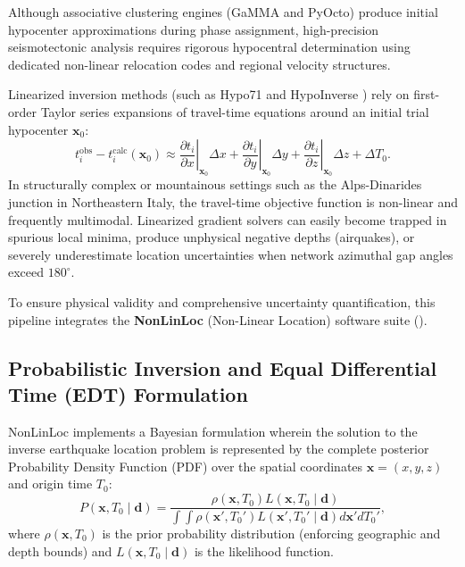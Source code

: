 Although associative clustering engines (GaMMA and PyOcto) produce initial hypocenter approximations during phase assignment, high-precision seismotectonic analysis requires rigorous hypocentral determination using dedicated non-linear relocation codes and regional velocity structures.

Linearized inversion methods (such as Hypo71 \cite{Hypo71} and HypoInverse \cite{HypoInverse}) rely on first-order Taylor series expansions of travel-time equations around an initial trial hypocenter $\mathbf{x}_0$:
\begin{equation}
  t_i^{\mathrm{obs}} - t_i^{\mathrm{calc}}(\mathbf{x}_0) \approx \left. \frac{\partial t_i}{\partial x} \right|_{\mathbf{x}_0} \Delta x + \left. \frac{\partial t_i}{\partial y} \right|_{\mathbf{x}_0} \Delta y + \left. \frac{\partial t_i}{\partial z} \right|_{\mathbf{x}_0} \Delta z + \Delta T_0.
\end{equation}
In structurally complex or mountainous settings such as the Alps-Dinarides junction in Northeastern Italy, the travel-time objective function is non-linear and frequently multimodal. Linearized gradient solvers can easily become trapped in spurious local minima, produce unphysical negative depths (airquakes), or severely underestimate location uncertainties when network azimuthal gap angles exceed $180^{\circ}$.

To ensure physical validity and comprehensive uncertainty quantification, this pipeline integrates the \textbf{NonLinLoc} (Non-Linear Location) software suite (\cite{NonLinLoc}).

\subsection{Probabilistic Inversion and Equal Differential Time (EDT) Formulation}
NonLinLoc implements a Bayesian formulation wherein the solution to the inverse earthquake location problem is represented by the complete posterior Probability Density Function (PDF) over the spatial coordinates $\mathbf{x} = (x, y, z)$ and origin time $T_0$:
\begin{equation}
  P(\mathbf{x}, T_0 \mid \mathbf{d}) = \frac{\rho(\mathbf{x}, T_0) L(\mathbf{x}, T_0 \mid \mathbf{d})}{\int \int \rho(\mathbf{x}', T_0') L(\mathbf{x}', T_0' \mid \mathbf{d}) d\mathbf{x}' dT_0'},
\end{equation}
where $\rho(\mathbf{x}, T_0)$ is the prior probability distribution (enforcing geographic and depth bounds) and $L(\mathbf{x}, T_0 \mid \mathbf{d})$ is the likelihood function.

